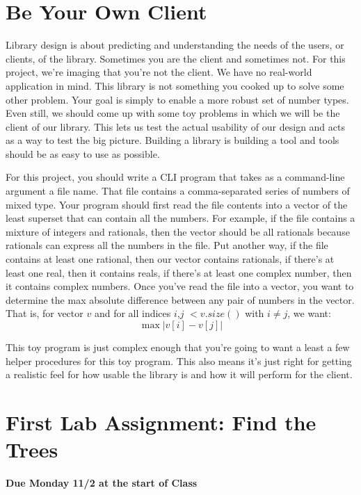 \documentclass[10pt]{article}
\begin{document}
\section{Be Your Own Client}

Library design is about predicting and understanding the needs of the users, or clients, of the library.  Sometimes you are the client and sometimes not. For this project, we're imaging that you're not the client. We have no real-world application in mind. This library is not something you cooked up to solve some other problem. Your goal is simply to enable a more robust set of number types. Even still, we should come up with some toy problems in which we will be the client of our library. This lets us test the actual usability of our design and acts as a way to test the big picture.  Building a library is building a tool and tools should be as easy to use as possible. 

For this project, you should write a CLI program that takes as a command-line argument a file name. That file contains a comma-separated series of numbers of mixed type. Your program  should first read the file contents into a vector of the least superset that can contain all the numbers. For example, if the file contains a mixture of integers and rationals, then the vector should be all rationals because rationals can express all the numbers in the file. Put another way, if the file contains at least one rational, then our vector contains rationals, if there's at least one real, then it contains reals, if there's at least one complex number, then it contains complex numbers. Once you've read the file into a vector, you want to determine the max absolute difference between any pair of numbers in the vector. That is, for vector $v$ and for all indices $i$,$j$ $< v.size()$ with $i\neq j$, we want:
\begin{equation}
\max | v[i] - v[j] |
\end{equation}

This toy program is just complex enough that you're going to want a least a few helper procedures for this toy program. This also means it's just right for getting a realistic feel for how usable the library is and how it will perform for the client.

\section{First Lab Assignment: Find the Trees }

\begin{center}
\textbf{Due Monday 11/2 at the start of Class}
\end{center}
\end{document}
